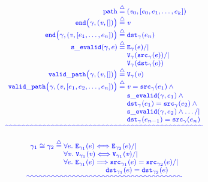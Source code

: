 \documentclass[acmsmall,screen]{acmart}  %
\newcommand{\defeq}{\mathbin{\stackrel{\triangle}{=}}} %
\providecommand{\DIFadd}[1]{{\protect\color{blue}\uwave{#1}}} %
\providecommand{\DIFaddbegin}{} %
\providecommand{\DIFaddFL}[1]{\DIFadd{#1}} %
\newcommand{\DIFaddincludegraphics}[2][]{{\color{blue}\fbox{\DIFOincludegraphics[#1]{#2}}}} %
\DeclareRobustCommand{\DIFaddbegin}{\DIFOaddbegin \let\includegraphics\DIFaddincludegraphics} %
\begin{document}
\DIFaddbegin \begin{figure}
  \begin{minipage}{.52\textwidth}
  \begin{equation*}
  {\DIFaddFL{\footnotesize
  \begin{array}{r@{}c@{}l}
    	\mathrm{path} \; &\defeq \;& (\m{v}_0, [e_0, e_1, \dots, e_k]) \\
      \mathtt{end}\big(\gamma, (\m{v}, [])\big)\;&\defeq\;& \m{v}\\
      \mathtt{end}\big(\gamma, (\m{v},[e_1,\dots,e_n])\big)\;&\defeq\;&
      \mathtt{dst}_{\gamma}(e_{n}) \\
      \mathtt{s\_evalid}(\gamma, e) \; &\defeq \;& \mathtt{E}_{\gamma}(e) /| \null \\
      &&\mathtt{V}_{\gamma}(\mathtt{src}_{\gamma}(e)) /| \null \\
      &&\mathtt{V}_{\gamma}(\mathtt{dst}_{\gamma}(e)) \\
      \mathtt{valid\_path}\big(\gamma, (\m{v},[])\big) \;&\defeq \;& \mathtt{V}_{\gamma}(\m{v})\\
      \mathtt{valid\_path}\big(\gamma, (\m{v},[e_1,e_2,\dots,e_n])\big) \; &\defeq \;& \m{v}=\mathtt{src}_{\gamma}(e_1) \wedge \null \\
      &&\mathtt{s\_evalid}(\gamma,e_1) \wedge \null \\
      &&\mathtt{dst}_{\gamma}(e_1)=\mathtt{src}_{\gamma}(e_2) \wedge \null \\
      &&\mathtt{s\_evalid}(\gamma, e_2) \wedge \dots /| \null \\
      &&\mathtt{dst}_{\gamma}(e_{n-1})=\mathtt{src}_{\gamma}(e_n)
  \end{array}}}
  \end{equation*}
  \end{minipage}\begin{minipage}{.5\textwidth}
  \begin{equation*}
  {\DIFaddFL{\footnotesize
  \begin{array}{r@{}c@{}l}
      \gamma_1 \cong \gamma_2 \; &\defeq\;&
        \forall e.~\mathtt{E}_{\gamma_1}(e) <=> \mathtt{E}_{\gamma_2}(e) /| \null \\
        &&\forall \m{v}.~\mathtt{V}_{\gamma_1}(\m{v}) <=> \mathtt{V}_{\gamma_1}(\m{v}) /| \null \\
        &&\forall e.~\mathtt{E}_{\gamma_1}(e) ==> \mathtt{src}_{\gamma_1}(e) = \mathtt{src}_{\gamma_2}(e) /| \null \\
        &&\hspace{5.9em} \mathtt{dst}_{\gamma_1}(e) = \mathtt{dst}_{\gamma_2}(e) \\

\end{array}}}
\end{equation*}
\end{minipage}
\end{figure}
\end{document}
